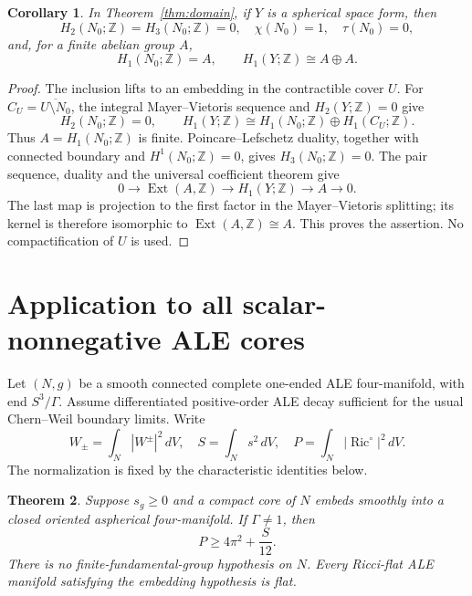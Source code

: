\documentclass[11pt]{article}
\newtheorem{theorem}{Theorem}
\newtheorem{corollary}[theorem]{Corollary}
\DeclareMathOperator{\Ric}{Ric}
\DeclareMathOperator{\Ext}{Ext}
\newcommand{\Z}{\mathbb Z}
\begin{document}
\begin{corollary}\label{cor:homology}
In Theorem~\ref{thm:domain}, if $Y$ is a spherical space form, then
\[
 H_2(N_0;\Z)=H_3(N_0;\Z)=0,\quad
 \chi(N_0)=1,\quad \tau(N_0)=0,
\]
and, for a finite abelian group $A$,
\[
 H_1(N_0;\Z)=A,\qquad H_1(Y;\Z)\cong A\oplus A.
\]
\end{corollary}

\begin{proof}
The inclusion lifts to an embedding in the contractible cover $U$.
For $C_U=\overline{U\setminus N_0}$, the integral Mayer--Vietoris
sequence and $H_2(Y;\Z)=0$ give
\[
 H_2(N_0;\Z)=0,\qquad
 H_1(Y;\Z)\cong H_1(N_0;\Z)\oplus H_1(C_U;\Z).
\]
Thus $A=H_1(N_0;\Z)$ is finite. Poincare--Lefschetz duality, together
with connected boundary and $H^1(N_0;\Z)=0$, gives $H_3(N_0;\Z)=0$.
The pair sequence, duality and the universal coefficient theorem give
\[
 0\longrightarrow\Ext(A,\Z)\longrightarrow H_1(Y;\Z)
   \longrightarrow A\longrightarrow0.
\]
The last map is projection to the first factor in the Mayer--Vietoris
splitting; its kernel is therefore isomorphic to $\Ext(A,\Z)\cong A$.
This proves the assertion. No compactification of $U$ is used.
\end{proof}

\section{Application to all scalar-nonnegative ALE cores}
Let $(N,g)$ be a smooth connected complete one-ended ALE four-manifold,
with end $S^3/\Gamma$. Assume differentiated positive-order ALE decay
sufficient for the usual Chern--Weil boundary limits. Write
\[
 W_\pm=\int_N|W^\pm|^2\,dV,
 \quad S=\int_Ns^2\,dV,
 \quad P=\int_N|\Ric^\circ|^2\,dV.
\]
The normalization is fixed by the characteristic identities below.

\begin{theorem}\label{thm:ale}
Suppose $s_g\ge0$ and a compact core of $N$ embeds smoothly into a
closed oriented aspherical four-manifold. If $\Gamma\ne1$, then
\[
 \boxed{P\ge4\pi^2+\frac{S}{12}.}
\]
There is no finite-fundamental-group hypothesis on $N$.
Every Ricci-flat ALE manifold satisfying the embedding hypothesis is flat.
\end{theorem}
\end{document}
